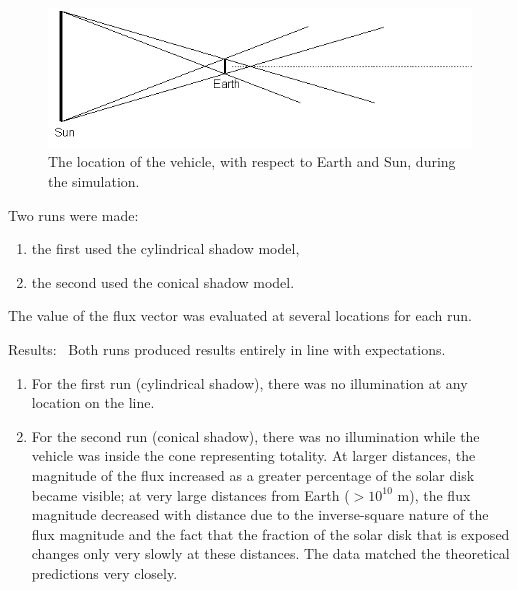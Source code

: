 \begin{description}
        \begin{figure}[!ht]
          \includegraphics[width=180mm]{figs/eclipse/annular_eclipse_layout.jpg}
          \caption{The location of the vehicle, with respect to Earth and Sun,
                 during the simulation.}
          \label{fig:ivv_annular_eclipse_layout}
        \end{figure}
        Two runs were made:
        \begin{enumerate}
          \item{} the first used the cylindrical shadow model,
          \item{} the second used the conical shadow model.
        \end{enumerate}
          The value of the flux vector was evaluated at several
          locations for each run.
      \item{Results:}\ \newline
        Both runs produced results entirely in line with expectations.
        \begin{enumerate}
          \item{}
            For the first run (cylindrical shadow), there was no illumination at any location on
            the line.
          \item{}
            For the second run (conical shadow), there was no illumination while the vehicle
            was inside the cone representing totality.
            At larger distances, the magnitude of the flux increased as a
            greater percentage of the solar disk became visible; at very
            large distances from Earth ($>10^{10}$  m), the flux magnitude
            decreased with distance due to the inverse-square nature of
            the flux magnitude and the fact that the fraction of the solar
            disk that is exposed changes only very slowly at these distances.
            The data matched the theoretical predictions very closely.
            \begin{figure}[!ht]

\end{figure}
\end{enumerate}
\end{description}
